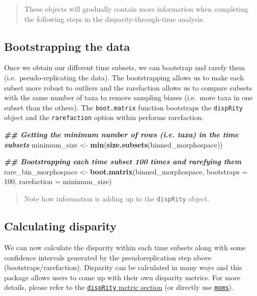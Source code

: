 \documentclass[
]{book}
\newenvironment{Shaded}{\begin{snugshade}}{\end{snugshade}}
\newcommand{\AttributeTok}[1]{\textcolor[rgb]{0.13,0.29,0.53}{#1}}
\newcommand{\DecValTok}[1]{\textcolor[rgb]{0.00,0.00,0.81}{#1}}
\newcommand{\DocumentationTok}[1]{\textcolor[rgb]{0.56,0.35,0.01}{\textbf{\textit{#1}}}}
\newcommand{\FunctionTok}[1]{\textcolor[rgb]{0.13,0.29,0.53}{\textbf{#1}}}
\newcommand{\NormalTok}[1]{#1}
\newcommand{\OtherTok}[1]{\textcolor[rgb]{0.56,0.35,0.01}{#1}}
\begin{document}
\begin{quote}
These objects will gradually contain more information when completing the following steps in the disparity-through-time analysis.
\end{quote}

\hypertarget{bootstrapping-the-data-1}{%
\subsection{Bootstrapping the data}\label{bootstrapping-the-data-1}}

Once we obtain our different time subsets, we can bootstrap and rarefy them (i.e.~pseudo-replicating the data).
The bootstrapping allows us to make each subset more robust to outliers and the rarefaction allows us to compare subsets with the same number of taxa to remove sampling biases (i.e.~more taxa in one subset than the others).
The \texttt{boot.matrix} function bootstraps the \texttt{dispRity} object and the \texttt{rarefaction} option within performs rarefaction.

\begin{Shaded}
\begin{Highlighting}[]
\DocumentationTok{\#\# Getting the minimum number of rows (i.e. taxa) in the time subsets}
\NormalTok{minimum\_size }\OtherTok{\textless{}{-}} \FunctionTok{min}\NormalTok{(}\FunctionTok{size.subsets}\NormalTok{(binned\_morphospace))}

\DocumentationTok{\#\# Bootstrapping each time subset 100 times and rarefying them }
\NormalTok{rare\_bin\_morphospace }\OtherTok{\textless{}{-}} \FunctionTok{boot.matrix}\NormalTok{(binned\_morphospace, }\AttributeTok{bootstraps =} \DecValTok{100}\NormalTok{,}
    \AttributeTok{rarefaction =}\NormalTok{ minimum\_size)}
\end{Highlighting}
\end{Shaded}

\begin{quote}
Note how information is adding up to the \texttt{dispRity} object.
\end{quote}

\hypertarget{calculating-disparity-1}{%
\subsection{Calculating disparity}\label{calculating-disparity-1}}

We can now calculate the disparity within each time subsets along with some confidence intervals generated by the pseudoreplication step above (bootstraps/rarefaction).
Disparity can be calculated in many ways and this package allows users to come up with their own disparity metrics.
For more details, please refer to the \protect\hyperlink{disparity-metrics}{\texttt{dispRity} metric section} (or directly use \href{https://tguillerme.shinyapps.io/moms/}{\texttt{moms}}).
\end{document}
